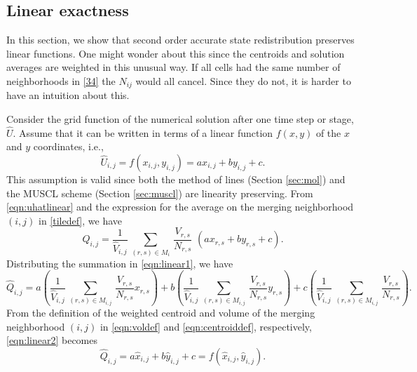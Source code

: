 \subsection{Linear exactness} \label{sec:linex}
In this section, we show that second order accurate state redistribution preserves linear functions.
One might wonder about this since the centroids and solution averages are weighted in this unusual way.
If all cells had the same number of neighborhoods in \eqref{34} the $N_{ij}$ would all cancel. 
Since they do not, it is harder to have an intuition about this.

Consider the grid function of the numerical solution after one time step
or stage, $\widehat{U}$.  Assume that it can be written in terms of a linear function $f(x,y)$ of the $x$ and $y$ coordinates, i.e.,
\begin{equation}
    \label{eqn:uhatlinear}
\widehat{U}_{i,j} = f(x_{i,j},y_{i,j}) = ax_{i,j} + by_{i,j} + c.
\end{equation}
This assumption is valid since both the method of lines (Section \ref{sec:mol}) and the MUSCL scheme (Section \ref{sec:muscl}) are linearity preserving.  
From \eqref{eqn:uhatlinear} and the expression for the average on the merging neighborhood $(i,j)$ in \eqref{tiledef}, we have
\begin{equation}
    \label{eqn:linear1}
\widehat{Q}_{i,j} = \frac{1}{{\widehat V}_{i,j}} \, \sum_{(r,s) \in M_i} \,  
\frac{V_{r,s}}{N_{r,s}}  \,\, (ax_{r,s} + by_{r,s} + c).
\end{equation}
Distributing the summation in \eqref{eqn:linear1}, we have
\begin{equation}\label{eqn:linear2}
\widehat{Q}_{i,j} =  a \left(\frac{1}{{\widehat V}_{i,j}} \, \sum_{(r,s) \in M_{i,j}} \,  
\frac{V_{r,s}}{N_{r,s}} x_{r,s} \right) + b\left(\frac{1}{{\widehat V}_{i,j}} \, \sum_{(r,s) \in M_{i,j}} \,  
\frac{V_{r,s}}{N_{r,s}} y_{r,s} \right) + c\left(\frac{1}{{\widehat V}_{i,j}} \, \sum_{(r,s) \in M_{i,j}} \,
\frac{V_{r,s}}{N_{r,s}}\right) .
\end{equation}
From the definition of the weighted centroid and volume of the merging neighborhood
$(i,j)$ in \eqref{eqn:voldef} and \eqref{eqn:centroiddef}, respectively, \eqref{eqn:linear2} becomes
\begin{equation}\label{eqn:linear3}
\widehat{Q}_{i,j} =  a \widehat{x}_{i,j} + b\widehat{y}_{i,j} + c = f(\widehat{x}_{i,j},\widehat{y}_{i,j}).
\end{equation}
